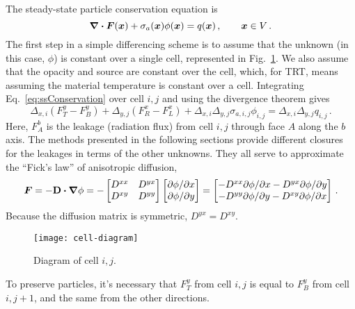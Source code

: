 The steady-state particle conservation equation is
\begin{equation}\label{eq:ssConservation}
  \bm{\nabla} \bm{\cdot} \bm{F}(\bm{x}) + \sigma_a(\bm{x}) \phi(\bm{x}) =
  q(\bm{x})\,,\qquad \bm{x} \in V\,.
\end{equation}
The first step in a simple differencing scheme is to assume that the unknown
(in this case, $\phi$) is constant over a single cell, represented in
Fig.~\ref{fig:cellDiagram}. We also assume that the opacity and source are
constant over the cell, which, for TRT, means assuming the material temperature
is constant over a cell. Integrating Eq.~\eqref{eq:ssConservation} over cell
$i,j$ and using the divergence theorem gives
\begin{equation} \label{eq:ssConservationDisc}
  \Delta_{x,i} \left( F_T^y - F_B^y \right)
+ \Delta_{y,j} \left( F_R^x - F_L^x \right)
+ \Delta_{x,i}\Delta_{y,j} \sigma_{a,i,j} \phi_{i,j}
= \Delta_{x,i}\Delta_{y,j} q_{i,j}\,.
\end{equation}
Here, $F_A^b$ is the leakage (radiation flux) from cell $i,j$ through face $A$
along the $b$ axis. The methods presented in the following sections provide
different closures for the leakages in terms of the other unknowns. They all
serve to approximate the ``Fick's law'' of anisotropic diffusion,
\begin{equation*}
  \bm{F} = - \mathbf{D} \bm{\cdot} \bm{\nabla} \phi
  = -
  \begin{bmatrix}
    D^{xx} & D^{yx} \\
    D^{xy} & D^{yy}
  \end{bmatrix}
  \begin{bmatrix}
    {\partial \phi}/{\partial x} \\
    {\partial \phi}/{\partial y}
  \end{bmatrix}
  = 
  \begin{bmatrix}
    - D^{xx} {\partial \phi}/{\partial x}
    - D^{yx} {\partial \phi}/{\partial y} \\
    - D^{yy} {\partial \phi}/{\partial y}
    - D^{xy} {\partial \phi}/{\partial x}
  \end{bmatrix}
  \,.
\end{equation*}
Because the diffusion matrix is symmetric, $D^{yx}=D^{xy}$.

\begin{figure}[htb]
  \centering
  \texttt{[image: cell-diagram]}
  \caption{Diagram of cell $i,j$.}
  \label{fig:cellDiagram}
\end{figure}

To preserve particles, it's necessary that $F_T^y$ from cell $i,j$ is equal to
$F_B^y$ from cell $i,{j+1}$, and the same from the other directions.

